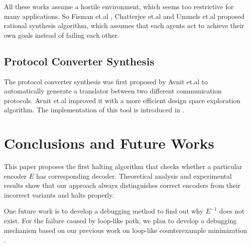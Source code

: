 \documentclass[journal]{IEEEtran}
\begin{document}
All these works assume a hostile environment,
which seems too restrictive for many applications.
So Fisman et.al \cite{rationalsyn_tacas10}, Chatterjee et.al \cite{assguasyn_tacas07} and Ummels et.al \cite{ralgame_istta06} proposed rational synthesis algorithm,
which assumes that each agents act to achieve their own goals instead of failing each other.


\subsection{Protocol Converter Synthesis}
The protocol converter synthesis was first proposed by Avnit et.al \cite{converter_date08} to automatically generate a translator between two different communication protocols.
Avnit et.al\cite{converter_date09} improved it with a more efficient design space exploration algorithm.
The implementation of this tool is introduced in \cite{converter_tacas10}.


\section{Conclusions and Future Works}\label{sec_conclude}

This paper proposes the first halting algorithm that checks whether a particular encoder $E$ has corresponding decoder.
Theoretical analysis and experimental results show that our approach always distinguishes correct encoders from their incorrect variants and halts properly.

One future work is to develop a debugging method to find out why $E^{-1}$ does not exist.
For the failure caused by loop-like path,
we plan to develop a debugging mechanism based on our previous work on loop-like counterexample minimization \cite{ShengYuShen:charme05}.



%
%
\end{document}
